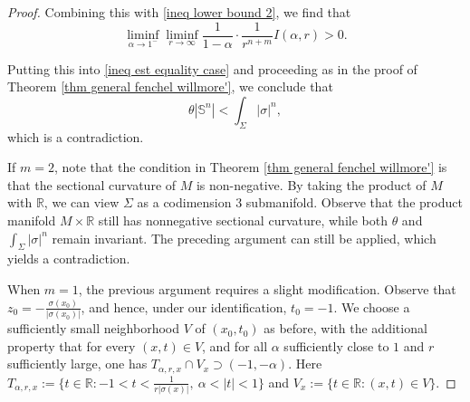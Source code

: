 \documentclass[11pt, reqno]{amsart}
\numberwithin{equation}{section}
\begin{document}
\begin{proof}
Combining this with \eqref{ineq lower bound 2}, we find that
$$
\liminf_{\alpha \rightarrow 1^{-}} \liminf_{r \rightarrow \infty}
\frac{1}{1-\alpha}\cdot \frac{1}{r^{n+m}} I(\alpha, r) > 0.
$$

Putting this into \eqref{ineq est equality case} and proceeding as in the proof of Theorem \ref{thm general fenchel willmore'}, we conclude that
$$
\theta|\mathbb S^{n}|< \int_{\Sigma} |\sigma|^{n},
$$
which is a contradiction.

If $m=2$, note that the condition in Theorem \ref{thm general fenchel willmore'} is that the sectional curvature of $M$ is non-negative. By taking the product of $M$ with $\mathbb{R}$, we can view $\Sigma$ as a codimension $3$ submanifold. Observe that the product manifold $M \times \mathbb{R}$ still has nonnegative sectional curvature, while both $\theta$ and $\int_{\Sigma}|\sigma|^n$ remain invariant. The preceding argument can still be applied, which yields a contradiction.

When $m = 1$, the previous argument requires a slight modification. Observe that $z_0 = -\frac{\sigma(x_0)}{|\sigma(x_0)|}$, and hence, under our identification, $t_0 = -1$. We choose a sufficiently small neighborhood $V$ of $(x_0, t_0)$ as before, with the additional property that for every $(x, t)\in V$, and for all $\alpha$ sufficiently close to $1$ and $r$ sufficiently large, one has $T_{\alpha, r, x}\cap V_x \supset (-1, -\alpha)$. Here $T_{\alpha, r, x}:= \{ t \in \mathbb{R}: -1 < t < \tfrac{1}{r|\sigma(x)|}, \ \alpha < |t| < 1 \}$ and $V_x:= \{ t \in \mathbb{R}: (x, t)\in V \}$.


\end{proof}
\end{document}
